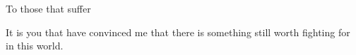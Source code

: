 \documentclass{ucbthesis}
\begin{document}


\maketitle
\approvalpage
\copyrightpage



\begin{frontmatter}

\begin{dedication}
\null\vfil
\begin{center}
To those that suffer\\\vspace{12pt}

It is you that have convinced me that there is something still worth
fighting for in this world.

\end{center}
\vfil\null
\end{dedication}


\tableofcontents
\clearpage
\listoffigures
\clearpage
\listoftables


  


\end{frontmatter}

\pagestyle{headings}






\printbibliography
\begin{appendices}
  
\end{appendices}
\end{document}

